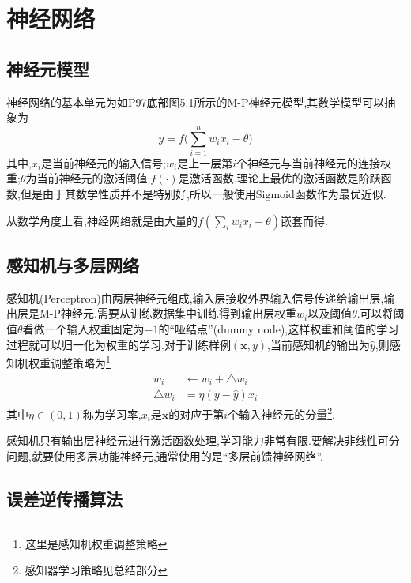 \chapter{神经网络}

\section{神经元模型}

神经网络的基本单元为如P97底部图5.1所示的M-P神经元模型,其数学模型可以抽象为
\begin{equation}
y=f\Big(\sum_{i=1}^nw_ix_i-\theta\Big)
\end{equation}
其中,$x_i$是当前神经元的输入信号;$w_i$是上一层第$i$个神经元与当前神经元的连接权重;$\theta$为当前神经元的激活阈值;$f(\cdot)$是激活函数.理论上最优的激活函数是阶跃函数,但是由于其数学性质并不是特别好,所以一般使用Sigmoid函数作为最优近似.

从数学角度上看,神经网络就是由大量的$f(\sum_iw_ix_i-\theta)$嵌套而得.

\section{感知机与多层网络}

感知机(Perceptron)由两层神经元组成,输入层接收外界输入信号传递给输出层,输出层是M-P神经元.需要从训练数据集中训练得到输出层权重$w_i$以及阈值$\theta$.可以将阈值$\theta$看做一个输入权重固定为$-1$的``哑结点''(dummy node),这样权重和阈值的学习过程就可以归一化为权重的学习.对于训练样例$(\mathbf x,y)$,当前感知机的输出为$\hat y$,则感知机权重调整策略为\footnote{这里是感知机权重调整策略}
\begin{equation}\begin{split}
w_i&\leftarrow w_i+\bigtriangleup w_i \\
\bigtriangleup w_i&=\eta(y-\hat y)x_i
\end{split}\end{equation}
其中$\eta\in (0,1)$称为学习率,$x_i$是$\bm x$的对应于第$i$个输入神经元的分量\footnote{感知器学习策略见总结部分}.

感知机只有输出层神经元进行激活函数处理,学习能力非常有限.要解决非线性可分问题,就要使用多层功能神经元,通常使用的是``多层前馈神经网络''.

\section{误差逆传播算法}

